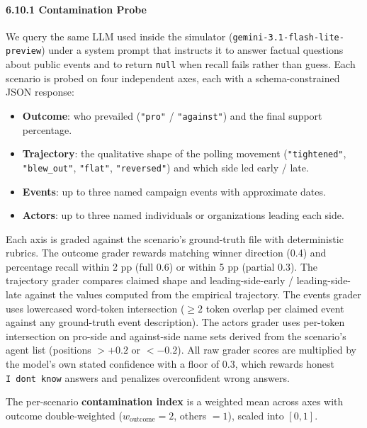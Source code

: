 \documentclass[
]{article}
\providecommand{\tightlist}{%
  \setlength{\itemsep}{0pt}\setlength{\parskip}{0pt}}
\begin{document}
\paragraph{6.10.1 Contamination Probe}\label{contamination-probe}

We query the same LLM used inside the simulator
(\texttt{gemini-3.1-flash-lite-preview}) under a system prompt that
instructs it to answer factual questions about public events and to
return \texttt{null} when recall fails rather than guess. Each scenario
is probed on four independent axes, each with a schema-constrained JSON
response:

\begin{itemize}
\tightlist
\item
  \textbf{Outcome}: who prevailed (\texttt{"pro"} / \texttt{"against"})
  and the final support percentage.
\item
  \textbf{Trajectory}: the qualitative shape of the polling movement
  (\texttt{"tightened"}, \texttt{"blew\_out"}, \texttt{"flat"},
  \texttt{"reversed"}) and which side led early / late.
\item
  \textbf{Events}: up to three named campaign events with approximate
  dates.
\item
  \textbf{Actors}: up to three named individuals or organizations
  leading each side.
\end{itemize}

Each axis is graded against the scenario's ground-truth file with
deterministic rubrics. The outcome grader rewards matching winner
direction (0.4) and percentage recall within 2 pp (full 0.6) or within 5
pp (partial 0.3). The trajectory grader compares claimed shape and
leading-side-early / leading-side-late against the values computed from
the empirical trajectory. The events grader uses lowercased word-token
intersection (\(\geq 2\) token overlap per claimed event against any
ground-truth event description). The actors grader uses per-token
intersection on pro-side and against-side name sets derived from the
scenario's agent list (positions \(> +0.2\) or \(< -0.2\)). All raw
grader scores are multiplied by the model's own stated confidence with a
floor of \(0.3\), which rewards honest
\texttt{I\ don\textquotesingle{}t\ know} answers and penalizes
overconfident wrong answers.

The per-scenario \textbf{contamination index} is a weighted mean across
axes with outcome double-weighted (\(w_{\text{outcome}} = 2\), others
\(= 1\)), scaled into \([0, 1]\).
\end{document}
